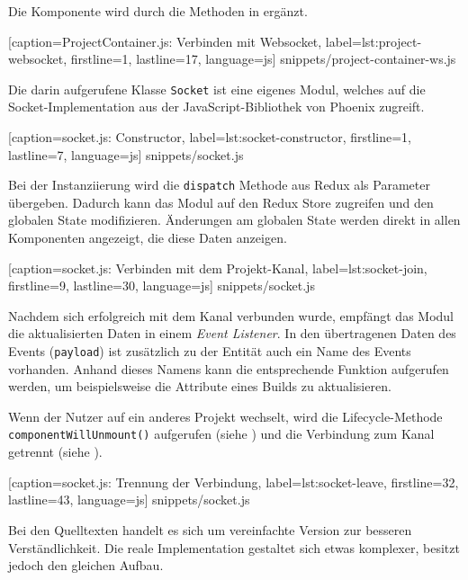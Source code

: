 Die Komponente wird durch die Methoden in  ergänzt.


  [caption={ProjectContainer.js: Verbinden mit Websocket},
  label={lst:project-websocket},
  firstline=1,
  lastline=17,
  language=js]
  {snippets/project-container-ws.js}

Die darin aufgerufene Klasse \texttt{Socket} ist eine eigenes Modul, welches auf die Socket-Implementation aus der JavaScript-Bibliothek von Phoenix zugreift.


  [caption={socket.js: Constructor},
  label={lst:socket-constructor},
  firstline=1,
  lastline=7,
  language=js]
  {snippets/socket.js}

Bei der Instanziierung wird die \texttt{dispatch} Methode aus Redux als Pa\-ra\-me\-ter über\-ge\-ben. Dadurch kann das Modul auf den Redux Store zugreifen und den globalen State modifizieren. Änderungen am globalen State werden direkt in allen Komponenten angezeigt, die diese Daten anzeigen.


  [caption={socket.js: Verbinden mit dem Projekt-Kanal},
  label={lst:socket-join},
  firstline=9,
  lastline=30,
  language=js]
  {snippets/socket.js}

Nachdem sich erfolgreich mit dem Kanal verbunden wurde, empfängt das Modul die aktualisierten Daten in einem \emph{Event Listener}. In den übertragenen Daten des Events (\texttt{payload}) ist zusätzlich zu der Entität auch ein Name des Events vorhanden. Anhand dieses Namens kann die entsprechende Funktion aufgerufen werden, um beispielsweise die Attribute eines Builds zu aktualisieren.

Wenn der Nutzer auf ein anderes Projekt wechselt, wird die Lifecycle-Methode \texttt{componentWillUnmount()} aufgerufen (siehe ) und die Verbindung zum Kanal getrennt (siehe ).


  [caption={socket.js: Trennung der Verbindung},
  label={lst:socket-leave},
  firstline=32,
  lastline=43,
  language=js]
  {snippets/socket.js}

Bei den Quelltexten handelt es sich um vereinfachte Version zur besseren Ver\-ständ\-lich\-keit. Die reale Implementation gestaltet sich etwas komplexer, besitzt jedoch den gleichen Aufbau.
